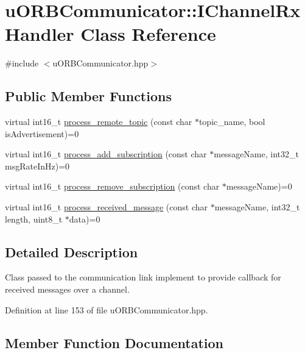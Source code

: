 \hypertarget{classuORBCommunicator_1_1IChannelRxHandler}{}\section{u\+O\+R\+B\+Communicator\+:\+:I\+Channel\+Rx\+Handler Class Reference}
\label{classuORBCommunicator_1_1IChannelRxHandler}


{\ttfamily \#include $<$u\+O\+R\+B\+Communicator.\+hpp$>$}

\subsection*{Public Member Functions}
\begin{DoxyCompactItemize}
\item 
virtual int16\+\_\+t \hyperlink{classuORBCommunicator_1_1IChannelRxHandler_ab961c5d18e9837e36927e3d25ef90da3}{process\+\_\+remote\+\_\+topic} (const char $\ast$topic\+\_\+name, bool is\+Advertisement)=0
\item 
virtual int16\+\_\+t \hyperlink{classuORBCommunicator_1_1IChannelRxHandler_a5d851e90495d4c68b56bb5e299a17533}{process\+\_\+add\+\_\+subscription} (const char $\ast$message\+Name, int32\+\_\+t msg\+Rate\+In\+Hz)=0
\item 
virtual int16\+\_\+t \hyperlink{classuORBCommunicator_1_1IChannelRxHandler_ad7dee17f2e116fb7cdcd7d70b3d27544}{process\+\_\+remove\+\_\+subscription} (const char $\ast$message\+Name)=0
\item 
virtual int16\+\_\+t \hyperlink{classuORBCommunicator_1_1IChannelRxHandler_a9fbd88a46229eaf6acb13d3724a2c6f7}{process\+\_\+received\+\_\+message} (const char $\ast$message\+Name, int32\+\_\+t length, uint8\+\_\+t $\ast$data)=0
\end{DoxyCompactItemize}


\subsection{Detailed Description}
Class passed to the communication link implement to provide callback for received messages over a channel. 

Definition at line 153 of file u\+O\+R\+B\+Communicator.\+hpp.



\subsection{Member Function Documentation}
\mbox{\label{classuORBCommunicator_1_1IChannelRxHandler_a5d851e90495d4c68b56bb5e299a17533}} 
